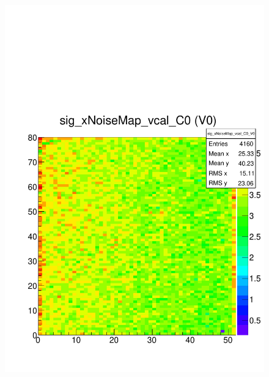 \documentclass[a4paper,12pt,twoside]{article}
\begin{document}
\begin{figure} [h!]
\centering
\begin{minipage}{.48\textwidth}
  \centering
  \includegraphics[width=\textwidth]{./Figures/HRSCurves_sigMap.pdf}
  \label{HRSCurves-sigMap}
\end{minipage}%
\hspace{2mm}
\begin{minipage}{.48\textwidth}
  \centering

\end{minipage}
\end{figure}
\end{document}
